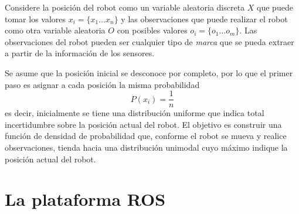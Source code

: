 \documentclass[letterpaper,12pt]{article}
\newcommand\ddfrac[2]{\frac{\displaystyle #1}{\displaystyle #2}}
\begin{document}
Considere la posición del robot como un variable aleatoria discreta $X$ que puede tomar los valores $x_i=\{x_1 \dots x_n\}$ y las observaciones que puede realizar el robot como otra variable aleatoria $O$ con posibles valores $o_i=\{o_1 \dots o_m\}$. Las observaciones del robot pueden ser cualquier tipo de \textit{marca} que se pueda extraer a partir de la información de los sensores. 

Se asume que la posición inicial se desconoce por completo, por lo que el primer paso es asignar a cada posición la misma probabilidad
\begin{equation}
P(x_i) = \ddfrac{1}{n}
\end{equation}
es decir, inicialmente se tiene una distribución uniforme que indica total incertidumbre sobre la posición actual del robot. El objetivo es construir una función de densidad de probabilidad que, conforme el robot se mueva y realice observaciones, tienda hacia una distribución unimodal cuyo máximo indique la posición actual del robot.

\section{La plataforma ROS}


\end{document}
